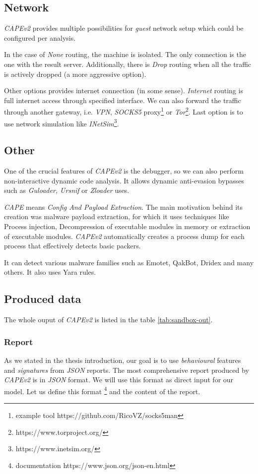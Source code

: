 \subsection{Network}
\emph{CAPEv2} provides multiple possibilities for \emph{guest} network setup which could be configured per analysis. 

In the case of \emph{None} routing, the machine is isolated. The only connection is the one with the result server. Additionally, there is \emph{Drop} routing when all the traffic is actively dropped (a more aggressive option). 

Other options provides internet connection (in some sense). \emph{Internet} routing is full internet access through specified interface. We can also forward the traffic through another gateway, i.e. \emph{VPN}, \emph{SOCKS5} proxy\footnote{example tool https://github.com/RicoVZ/socks5man} or \emph{Tor}\footnote{https://www.torproject.org/}. Last option is to use network simulation like \emph{INetSim}\footnote{https://www.inetsim.org/}.

\subsection{Other}
One of the crucial features of \emph{CAPEv2} is the debugger, so we can also perform non-interactive dynamic code analysis. It allows dynamic anti-evasion bypasses such as \emph{Guloader, Ursnif} or \emph{Zloader} uses.

\emph{CAPE} means \emph{Config And Payload Extraction}. The main motivation behind its creation was malware payload extraction, for which it uses techniques like Process injection, Decompression of executable modules in memory or extraction of executable modules. \emph{CAPEv2} automatically creates a process dump for each process that effectively detects basic packers.

It can detect various malware families such as Emotet, QakBot, Dridex and many others. It also uses Yara rules.

\subsection{Produced data}
The whole ouput of \emph{CAPEv2} is listed in the table \ref{tab:sandbox-out}.


\subsubsection{Report}
As we stated in the thesis introduction, our goal is to use \emph{behavioural} features and \emph{signatures} from \emph{JSON} reports.  The most comprehensive report produced by \emph{CAPEv2} is in \emph{JSON} format. We will use this format as direct input for our model. Let us define this format \footnote{documentation https://www.json.org/json-en.html} and the content of the report.

